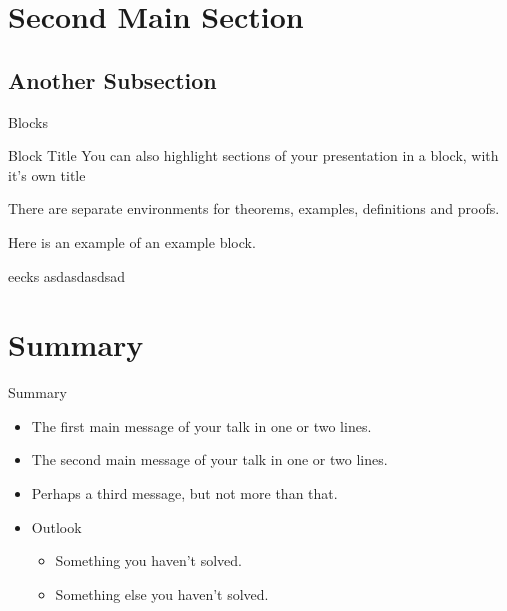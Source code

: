 \documentclass{beamer}
\begin{document}
\section{Second Main Section}

\subsection{Another Subsection}

\begin{frame}{Blocks}
    \begin{block}{Block Title}
        You can also highlight sections of your presentation in a block, with it's own title
    \end{block}
    \begin{theorem}
        There are separate environments for theorems, examples, definitions and proofs.
    \end{theorem}
    \begin{example}
        Here is an example of an example block.
    \end{example}
    \begin{beamercolorbox}[wd=7cm]{eecks}
	    asdasdasdsad
    \end{beamercolorbox}
\end{frame}

\section*{Summary}

\begin{frame}{Summary}
    \begin{itemize}
        \item
            The \alert{first main message} of your talk in one or two lines.
        \item
            The \alert{second main message} of your talk in one or two lines.
        \item
            Perhaps a \alert{third message}, but not more than that.
    \end{itemize}

    \begin{itemize}
        \item
            Outlook
            \begin{itemize}
                \item
                    Something you haven't solved.
                \item
                    Something else you haven't solved.
            \end{itemize}
    \end{itemize}
\end{frame}
\end{document}
